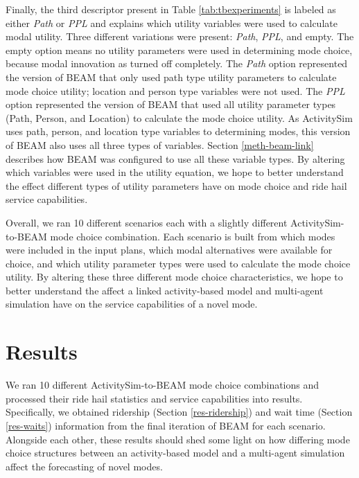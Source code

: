 \documentclass[12pt, oneside, openright]{byuthesis}
\begin{document}
Finally, the third descriptor present in Table \ref{tab:tbexperiments} is labeled as either \emph{Path} or \emph{PPL} and explains which utility variables were used to calculate modal utility. Three different variations were present: \emph{Path}, \emph{PPL}, and empty. The empty option means no utility parameters were used in determining mode choice, because modal innovation as turned off completely. The \emph{Path} option represented the version of BEAM that only used path type utility parameters to calculate mode choice utility; location and person type variables were not used. The \emph{PPL} option represented the version of BEAM that used all utility parameter types (Path, Person, and Location) to calculate the mode choice utility. As ActivitySim uses path, person, and location type variables to determining modes, this version of BEAM also uses all three types of variables. Section \ref{meth-beam-link} describes how BEAM was configured to use all these variable types. By altering which variables were used in the utility equation, we hope to better understand the effect different types of utility parameters have on mode choice and ride hail service capabilities.

Overall, we ran 10 different scenarios each with a slightly different ActivitySim-to-BEAM mode choice combination. Each scenario is built from which modes were included in the input plans, which modal alternatives were available for choice, and which utility parameter types were used to calculate the mode choice utility. By altering these three different mode choice characteristics, we hope to better understand the affect a linked activity-based model and multi-agent simulation have on the service capabilities of a novel mode.

\hypertarget{results}{%
\chapter{Results}\label{results}}

We ran 10 different ActivitySim-to-BEAM mode choice combinations and processed their ride hail statistics and service capabilities into results. Specifically, we obtained ridership (Section \ref{res-ridership}) and wait time (Section \ref{res-waits}) information from the final iteration of BEAM for each scenario. Alongside each other, these results should shed some light on how differing mode choice structures between an activity-based model and a multi-agent simulation affect the forecasting of novel modes.
\end{document}
